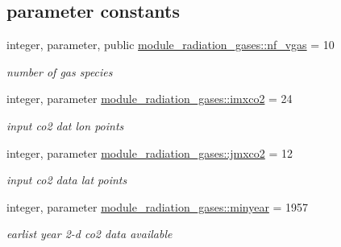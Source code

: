 \subsection*{parameter constants}
\begin{DoxyCompactItemize}
\item 
\mbox{\label{group__module__radiation__gases_gaffc350828412da77ff3cf3e617ddc66c}} 
integer, parameter, public \hyperlink{group__module__radiation__gases_gaffc350828412da77ff3cf3e617ddc66c}{module\+\_\+radiation\+\_\+gases\+::nf\+\_\+vgas} = 10
\begin{DoxyCompactList}\small\item\em number of gas species \end{DoxyCompactList}\item 
\mbox{\label{group__module__radiation__gases_ga46eb4079ff9932819b3ab133bf6a43d9}} 
integer, parameter \hyperlink{group__module__radiation__gases_ga46eb4079ff9932819b3ab133bf6a43d9}{module\+\_\+radiation\+\_\+gases\+::imxco2} = 24
\begin{DoxyCompactList}\small\item\em input co2 dat lon points \end{DoxyCompactList}\item 
\mbox{\label{group__module__radiation__gases_gaa56e209872093bfcbdaeb452f5e5e332}} 
integer, parameter \hyperlink{group__module__radiation__gases_gaa56e209872093bfcbdaeb452f5e5e332}{module\+\_\+radiation\+\_\+gases\+::jmxco2} = 12
\begin{DoxyCompactList}\small\item\em input co2 data lat points \end{DoxyCompactList}\item 
\mbox{\label{group__module__radiation__gases_ga3b26af64187b57999cadeced419b0f1b}} 
integer, parameter \hyperlink{group__module__radiation__gases_ga3b26af64187b57999cadeced419b0f1b}{module\+\_\+radiation\+\_\+gases\+::minyear} = 1957
\begin{DoxyCompactList}\small\item\em earlist year 2-\/d co2 data available \end{DoxyCompactList}\item 
\mbox{\label{group__module__radiation__gases_gafda5c1d1129d865b9772e0f58dea7598}} 

\end{DoxyCompactItemize}
